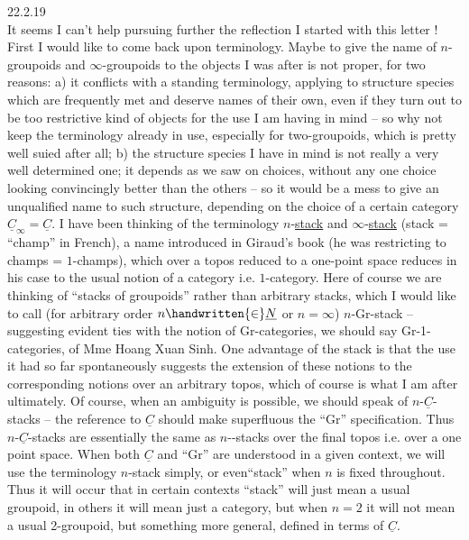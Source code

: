 
\hfill 22.2.19\\

 It seems I can't help pursuing further the reflection I started with this letter ! First I would like to come back upon terminology. Maybe to give the name of $n$-groupoids and $\infty$-groupoids to the objects I was after is not proper, for two reasons: a) it conflicts with a standing terminology, applying to structure species which are frequently met and deserve names of their own, even if they turn out to be too restrictive kind of objects for the use I am having in mind -- so why not keep the terminology already in use, especially for two-groupoids, which is pretty well suied after all; b) the structure species I have in mind is not really a very well determined one; it depends as we saw on choices, without any one choice looking convincingly better than the others -- so it would be a mess to give an unqualified name to such structure, depending on the choice of a certain category $\underline{C}_{\infty}=\underline{C}$. I have been thinking of the terminology $n$-\uline{stack} and $\infty$-\uline{stack} (stack = ``champ'' in French), a name introduced in Giraud's book (he was restricting to champs = $1$-champs), which over a topos reduced to a one-point space reduces in his case to the usual notion of a category i.e. $1$-category. Here of course we are thinking of ``stacks of groupoids'' rather than arbitrary stacks, which I would like to call (for arbitrary order $n\handwritten{\in}\underline{N}$ or $n=\infty$) $n$-Gr-stack -- suggesting evident ties with the notion of Gr-categories, we should say Gr-1-categories, of Mme Hoang Xuan Sinh. One advantage of the  stack is that the use it had so far spontaneously suggests the extension of these notions to the corresponding notions over an arbitrary topos, which of course is what I am after ultimately. Of course, when an ambiguity is possible, we should speak of  $n$-$\underline{C}$-stacks -- the reference to $\underline{C}$ should make superfluous the ``Gr'' specification. Thus $n$-$\underline{C}$-stacks are essentially the same as $n$--stacks over the final topos i.e. over a one point space. When both $\underline{C}$ and ``Gr'' are understood in a given context, we will use the  terminology $n$-stack simply, or even``stack'' when $n$ is fixed throughout. Thus it will occur that in certain contexts ``stack'' will just mean a usual groupoid,  in others it will mean just a category,  but when $n=2$ it will not mean a usual 2-groupoid, but something more general, defined in terms of $\underline{C}$.

